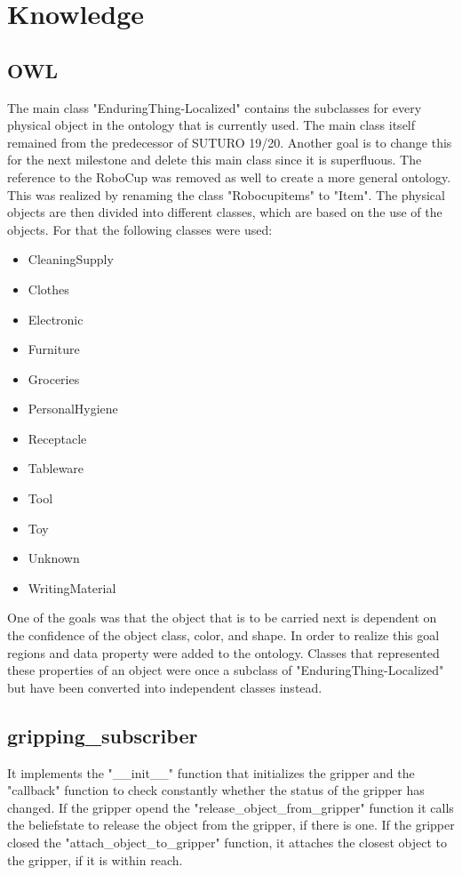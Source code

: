 \documentclass[main.tex]{subfiles}
\begin{document}
	
	\chapter{Knowledge}
		
		\section{OWL}
		The main class "EnduringThing-Localized" contains the subclasses for every physical object in the ontology that is currently used. The main class itself remained from the predecessor of SUTURO 19/20. Another goal is to change this for the next milestone and delete this main class since it is superfluous.
The reference to the RoboCup was removed as well to create a more general ontology. This was realized by renaming the class "Robocupitems" to "Item". The physical objects are then divided into different classes, which are based on the use of the objects. For that the following classes were used:
		
		\begin{itemize}
		\item CleaningSupply
		\item Clothes
		\item Electronic
		\item Furniture
		\item Groceries
		\item PersonalHygiene
		\item Receptacle
		\item Tableware
		\item Tool
		\item Toy
		\item Unknown
		\item WritingMaterial
		\end{itemize}
		
		One of the goals was that the object that is to be carried next is dependent on the confidence of the object class, color, and shape. In order to realize this goal regions and data property were added to the ontology. Classes that represented these properties of an object were once a subclass of "EnduringThing-Localized" but have been converted into independent classes instead.  


		\section{gripping\_subscriber}
		It implements the "\_\_init\_\_" function that initializes the gripper and the "callback" function to check constantly whether the status of the gripper has changed. If the gripper opend the "release\_object\_from\_gripper" function it calls the beliefstate to release the object from the gripper, if there is one. If the gripper closed the "attach\_object\_to\_gripper" function, it attaches the closest object to the gripper, if it is within reach.
\end{document}
